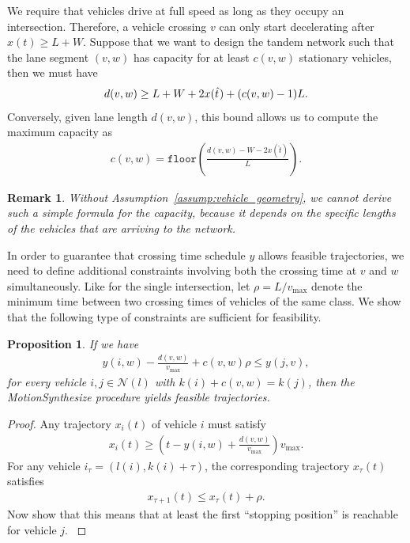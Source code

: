 \documentclass[a4paper]{article}
\theoremstyle{definition}
\theoremstyle{plain}
\newtheorem{remark}{Remark}
\newtheorem{proposition}{Proposition}
\begin{document}
We require that vehicles drive at full speed as long as they occupy an intersection. Therefore, a vehicle crossing $v$ can only start decelerating after $x(t) \geq L + W$.
%
Suppose that we want to design the tandem network such that the lane segment
$(v, w)$ has capacity for at least $c(v, w)$ stationary vehicles, then we must have
\begin{align*}
  d(v,w) \geq L + W + 2 x(\hat{t} \hspace{0.06em}) + (c(v, w) - 1) L.
\end{align*}
Conversely, given lane length $d(v,w)$, this bound allows us to compute the
maximum capacity as
\begin{align}\label{eq:max_capacity}
  c(v, w) = \texttt{floor}\left( \frac{d(v,w) - W - 2x(\hat{t})}{L} \right) .
\end{align}

\begin{remark}
  Without Assumption~\ref{assump:vehicle_geometry}, we cannot derive such a
  simple formula for the capacity, because it depends on the specific lengths of
  the vehicles that are arriving to the network.
\end{remark}

In order to guarantee that crossing time schedule $y$ allows feasible
trajectories, we need to define additional constraints involving both the
crossing time at $v$ and $w$ simultaneously. Like for the single intersection,
let $\rho = L / v_{\max}$ denote the minimum time between two crossing times of
vehicles of the same class. We show that the following type of constraints are
sufficient for feasibility.

\begin{proposition}\label{prop:buffer_constraint}
  If we have
  \begin{align}
  y(i, w) - \frac{d(v,w)}{v_{\max}} + c(v,w) \rho \leq y(j, v) ,
  \end{align}
  for every vehicle $i, j \in \mathcal{N}(l)$ with $k(i) + c(v,w) = k(j)$, then the
  MotionSynthesize procedure yields feasible trajectories.
\end{proposition}
\begin{proof}
{\color{gray}
  Any trajectory $x_{i}(t)$ of vehicle $i$ must satisfy
  \begin{align*}
    x_{i}(t) \geq \left(t - y(i, w) + \frac{d(v,w)}{v_{\max}}\right) v_{\max} .
  \end{align*}
  For any vehicle $i_{\tau} = (l(i), k(i) + \tau)$, the corresponding trajectory
  $x_{\tau}(t)$ satisfies
  \begin{align*}
    x_{\tau + 1}(t) \leq x_{\tau}(t) + \rho .
  \end{align*}
  Now show that this means that at least the first ``stopping position'' is
  reachable for vehicle $j$.
}
\end{proof}
\end{document}
